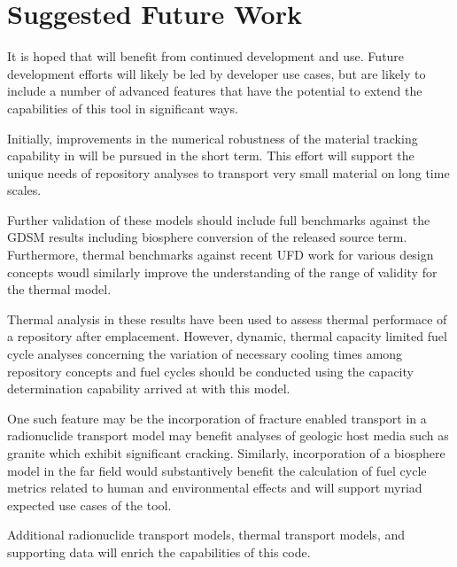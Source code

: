 \section{Suggested Future Work}
It is hoped that \Cyder will benefit from continued development and use. Future 
development efforts will likely be led by developer use cases, but are likely 
to include a number of advanced features that have the potential to extend the 
capabilities of this tool in significant ways. 

Initially, improvements in the numerical robustness of the material tracking 
capability in \Cyclus will be pursued in the short term. This effort will 
support the unique needs of repository analyses to transport very small 
material on long time scales.  

Further validation of these models should include full benchmarks against the 
\gls{GDSM} results including biosphere conversion of the released source term. 
Furthermore, thermal benchmarks against recent \gls{UFD} work for various 
design concepts woudl similarly improve the understanding of the range of 
validity for the thermal model. 

Thermal analysis in these results have been used to assess thermal performace 
of a repository after emplacement. However, dynamic, thermal capacity limited 
fuel cycle analyses concerning the variation of necessary cooling times among 
repository concepts and fuel cycles should be conducted using the capacity 
determination capability arrived at with this model.  

One such feature may be the incorporation of fracture enabled transport in a 
radionuclide transport model may benefit analyses of geologic host media such as 
granite which exhibit significant cracking. Similarly, incorporation of a 
biosphere model in the far field would substantively benefit the calculation of 
fuel cycle metrics related to human and environmental effects and will support 
myriad expected use cases of the tool.

Additional radionuclide transport models, thermal transport models, and 
supporting data will enrich the capabilities of this code. 

